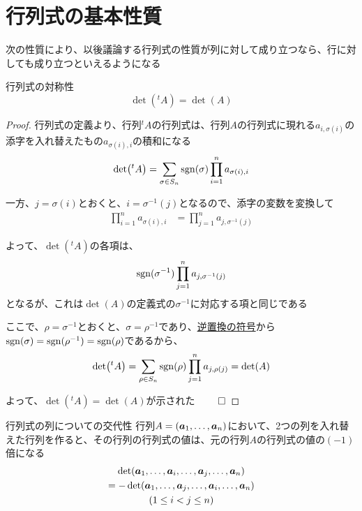 \documentclass[../../../topic_linear-algebra]{subfiles}
\begin{document}
\sectionline
\section{行列式の基本性質}

次の性質により、以後議論する行列式の性質が列に対して成り立つなら、行に対しても成り立つといえるようになる

\begin{theorem}{行列式の対称性}\label{thm:determinant-transpose-invariance}
  \begin{equation*}
    \det({}^t A) = \det(A)
  \end{equation*}
\end{theorem}

\begin{proof}
  行列式の定義より、行列${}^tA$の行列式は、行列$A$の行列式に現れる$a_{i,\sigma(i)}$の添字を入れ替えたもの$a_{\sigma(i),i}$の積和になる
  \begin{equation*}
    \det({}^t A) = \sum_{\sigma \in S_n} \operatorname{sgn}(\sigma) \prod_{i=1}^n a_{\sigma(i),i}
  \end{equation*}

  一方、$j=\sigma(i)$とおくと、$i = \sigma^{-1}(j)$となるので、添字の変数を変換して
  \begin{align*}
    \prod_{i=1}^n a_{\sigma(i),i}
     & = \prod_{j=1}^n a_{j,\sigma^{-1}(j)}
  \end{align*}

  よって、$\det({}^t A)$の各項は、
  \begin{equation*}
    \operatorname{sgn}(\sigma^{-1}) \prod_{j=1}^n a_{j,\sigma^{-1}(j)}
  \end{equation*}
  となるが、これは$\det(A)$の定義式の$\sigma^{-1}$に対応する項と同じである

  \br

  ここで、$\rho = \sigma^{-1}$とおくと、$\sigma = \rho^{-1}$であり、\hyperref[thm:sign-of-inverse-permutation]{逆置換の符号}から$\operatorname{sgn}(\sigma) = \operatorname{sgn}(\rho^{-1}) = \operatorname{sgn}(\rho)$であるから、
  \begin{equation*}
    \det({}^t A) = \sum_{\rho \in S_n} \operatorname{sgn}(\rho) \prod_{j=1}^n a_{j,\rho(j)}  = \det(A)
  \end{equation*}

  よって、$\det({}^t A) = \det(A)$が示された $\qed$
\end{proof}

\sectionline

\begin{theorem}{行列式の列についての交代性}
  行列$A = (\vb*{a}_1, \ldots, \vb*{a}_n)$において、2つの列を入れ替えた行列を作ると、その行列の行列式の値は、元の行列$A$の行列式の値の$(-1)$倍になる
  \begin{multline*}
    \det(\vb*{a}_1, \ldots, \vb*{a}_i, \ldots, \vb*{a}_j, \ldots, \vb*{a}_n) \\= -\det(\vb*{a}_1, \ldots, \vb*{a}_j, \ldots, \vb*{a}_i, \ldots, \vb*{a}_n) \\ (1 \leq i < j \leq n)
  \end{multline*}
\end{theorem}
\end{document}
